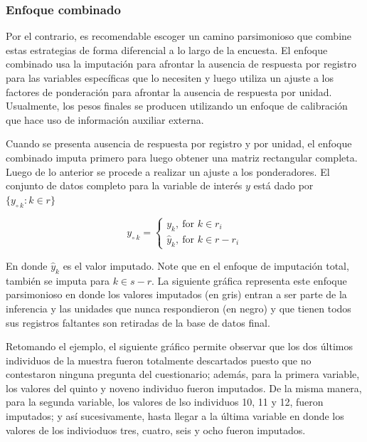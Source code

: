 \documentclass[
  10pt,
  spanish,
]{book}
\begin{document}
\hypertarget{enfoque-combinado}{%
\subsubsection*{Enfoque combinado}\label{enfoque-combinado}}

Por el contrario, es recomendable escoger un camino parsimonioso que combine estas estrategias de forma diferencial a lo largo de la encuesta. El enfoque combinado usa la imputación para afrontar la ausencia de respuesta por registro para las variables específicas que lo necesiten y luego utiliza un ajuste a los factores de ponderación para afrontar la ausencia de respuesta por unidad. Usualmente, los pesos finales se producen utilizando un enfoque de calibración que hace uso de información auxiliar externa.

Cuando se presenta ausencia de respuesta por registro y por unidad, el enfoque combinado imputa primero para luego obtener una matriz rectangular completa. Luego de lo anterior se procede a realizar un ajuste a los ponderadores. El conjunto de datos completo para la variable de interés \(y\) está dado por \(\{y_{\circ \  k}: k\in r\}\)

\[
y_{\circ \  k} = 
\begin{cases}
y_k, \ \text{for $k \in r_i$} \\
\hat{y}_k, \ \text{for $k \in r - r_i$}
\end{cases}
\]

En donde \(\hat{y}_k\) es el valor imputado. Note que en el enfoque de imputación total, también se imputa para \(k \in s-r\). La siguiente gráfica representa este enfoque parsimonioso en donde los valores imputados (en gris) entran a ser parte de la inferencia y las unidades que nunca respondieron (en negro) y que tienen todos sus registros faltantes son retiradas de la base de datos final.

Retomando el ejemplo, el siguiente gráfico permite observar que los dos últimos individuos de la muestra fueron totalmente descartados puesto que no contestaron ninguna pregunta del cuestionario; además, para la primera variable, los valores del quinto y noveno individuo fueron imputados. De la misma manera, para la segunda variable, los valores de lso individuos 10, 11 y 12, fueron imputados; y así sucesivamente, hasta llegar a la última variable en donde los valores de los indivioduos tres, cuatro, seis y ocho fueron imputados.
\end{document}
